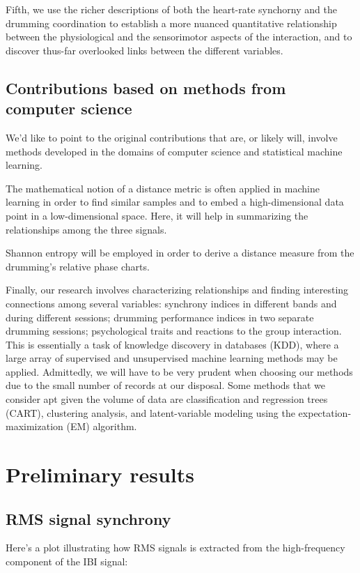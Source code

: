 \documentclass[a4paper, 11pt]{report}      %
\begin{document}
Fifth, we use the richer descriptions of both the heart-rate synchorny and the drumming coordination  to establish a more nuanced quantitative relationship between the physiological and the sensorimotor aspects of the interaction, and to discover thus-far overlooked links between the different variables.  

\section{Contributions based on methods from computer science}
We'd like to point to the original contributions that are, or likely will, involve methods developed in the domains of computer science and statistical machine learning.

The mathematical notion of a distance metric is often applied in machine learning in order to find similar samples and to embed a high-dimensional data point in a low-dimensional space. Here, it will help in summarizing the relationships among the three signals.

Shannon entropy will be employed in order to derive a distance measure from the drumming's relative phase charts.

Finally, our research involves characterizing relationships and finding interesting connections among several variables: synchrony indices in different bands and during different sessions; drumming performance indices in two separate drumming sessions; psychological traits and reactions to the group interaction. This is essentially a task of knowledge discovery in databases (KDD), where a large array of supervised and unsupervised machine learning methods may be applied. Admittedly, we will have to be very prudent when choosing our methods due to the small number of records at our disposal. Some methods that we consider apt given the volume of data are classification and regression trees (CART), clustering analysis, and latent-variable modeling using the expectation-maximization (EM) algorithm.




\chapter{Preliminary results}

\section{RMS signal synchrony}

Here's a plot illustrating how RMS signals is extracted from the high-frequency component of the IBI signal:
\end{document}
